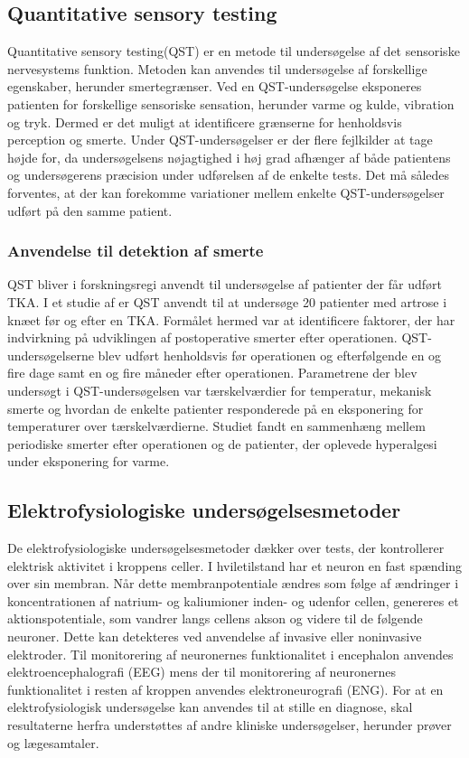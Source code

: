\subsection{Quantitative sensory testing}
Quantitative sensory testing(QST) er en metode til undersøgelse af det sensoriske nervesystems funktion. Metoden kan anvendes til undersøgelse af forskellige egenskaber, herunder smertegrænser. Ved en QST-undersøgelse eksponeres patienten for forskellige sensoriske sensation, herunder varme og kulde, vibration og tryk. Dermed er det muligt at identificere grænserne for henholdsvis perception og smerte. Under QST-undersøgelser er der flere fejlkilder at tage højde for, da undersøgelsens nøjagtighed i høj grad afhænger af både patientens og undersøgerens præcision under udførelsen af de enkelte tests. Det må således forventes, at der kan forekomme variationer mellem enkelte QST-undersøgelser udført på den samme patient. \citep{4}

\subsubsection{Anvendelse til detektion af smerte}
QST bliver i forskningsregi anvendt til undersøgelse af patienter der får udført TKA. I et studie af \citep{5} er QST anvendt til at undersøge 20 patienter med artrose i knæet før og efter en TKA. Formålet hermed var at identificere faktorer, der har indvirkning på udviklingen af postoperative smerter efter operationen. QST-undersøgelserne blev udført henholdsvis før operationen og efterfølgende en og fire dage samt en og fire måneder efter operationen. Parametrene der blev undersøgt i QST-undersøgelsen var tærskelværdier for temperatur, mekanisk smerte og hvordan de enkelte patienter responderede på en eksponering for temperaturer over tærskelværdierne. Studiet fandt en sammenhæng mellem periodiske smerter efter operationen og de patienter, der oplevede hyperalgesi under eksponering for varme. \citep{5} 

\subsection{Elektrofysiologiske undersøgelsesmetoder}
De elektrofysiologiske undersøgelsesmetoder dækker over tests, der kontrollerer elektrisk aktivitet i kroppens celler. I hviletilstand har et neuron en fast spænding over sin membran. Når dette membranpotentiale ændres som følge af ændringer i koncentrationen af natrium- og kaliumioner inden- og udenfor cellen, genereres et aktionspotentiale, som vandrer langs cellens akson og videre til de følgende neuroner. Dette kan detekteres ved anvendelse af invasive eller noninvasive elektroder. Til monitorering af neuronernes funktionalitet i encephalon anvendes elektroencephalografi (EEG) mens der til monitorering af neuronernes funktionalitet i resten af kroppen anvendes elektroneurografi (ENG). For at en elektrofysiologisk undersøgelse kan anvendes til at stille en diagnose, skal resultaterne herfra understøttes af andre kliniske undersøgelser, herunder prøver og lægesamtaler. \citep{6}

